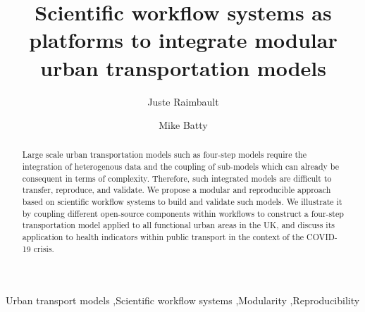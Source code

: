 \documentclass[3p,times,procedia]{elsarticle}
\begin{document}
\begin{frontmatter}


\title{Scientific workflow systems as platforms to integrate modular urban transportation models}

\author[a,b,c]{Juste Raimbault}
\author[a]{Mike Batty}

\address[a]{CASA, University College London, London, United Kingdom}
\address[b]{UPS CNRS 3611 Complex Systems Institute, Paris, France}
\address[c]{UMR CNRS 8504 G{\'e}ographie-cit{\'e}s, Paris, France}

\begin{abstract}
Large scale urban transportation models such as four-step models require the integration of heterogenous data and the coupling of sub-models which can already be consequent in terms of complexity. Therefore, such integrated models are difficult to transfer, reproduce, and validate. We propose a modular and reproducible approach based on scientific workflow systems to build and validate such models. We illustrate it by coupling different open-source components within workflows to construct a four-step transportation model applied to all functional urban areas in the UK, and discuss its application to health indicators within public transport in the context of the COVID-19 crisis.
\end{abstract}

\begin{keyword}
Urban transport models \sep Scientific workflow systems \sep Modularity \sep Reproducibility
\end{keyword}
\end{frontmatter}





\cite{usher2019software}

\cite{horl2021integrating}

\cite{horl2020reproducible}

\end{document}
